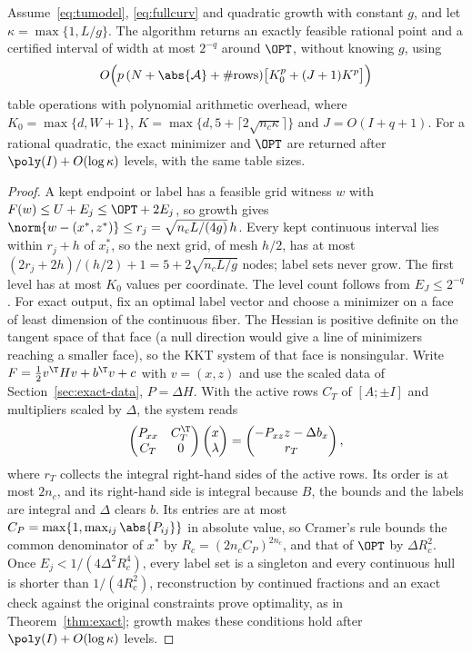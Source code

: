 \begin{theorem}[TU coupling]\label{thm:tu}
Assume~\eqref{eq:tumodel}, \eqref{eq:fullcurv} and quadratic growth with
constant $g$, and let $\kappa=\max\{1,L/g\}$. The algorithm returns an exactly
feasible rational point and a certified interval of width at most $2^{-q}$
around $\OPT$, without knowing $g$, using
\[
O\Bigl(p\,(N+\abs{\mathcal A}+\#\text{rows})\bigl[K_0^p+(J+1)K^p\bigr]\Bigr)
\]
table operations with polynomial arithmetic overhead, where
$K_0=\max\{d,W+1\}$, $K=\max\{d,5+\lceil2\sqrt{n_c\kappa}\rceil\}$ and
$J=O(I+q+1)$. For a rational quadratic, the exact minimizer and $\OPT$ are
returned after $\poly(I)+O(\log\kappa)$ levels, with the same table sizes.
\end{theorem}

\begin{proof}
A kept endpoint or label has a feasible grid witness $w$ with
$F(w)\le U+E_j\le\OPT+2E_j$, so growth gives
$\norm{w-(x^*,z^*)}\le r_j=\sqrt{n_cL/(4g)}\,h$. Every kept continuous interval
lies within $r_j+h$ of $x_i^*$, so the next grid, of mesh $h/2$, has at
most $(2r_j+2h)/(h/2)+1=5+2\sqrt{n_cL/g}$ nodes; label sets never grow. The
first level has at most $K_0$ values per coordinate. The level count follows
from $E_J\le2^{-q}$. For exact output, fix an optimal label vector and choose
a minimizer on a face of least dimension of the continuous fiber. The
Hessian is positive definite on the tangent space of that face (a null
direction would give a line of minimizers reaching a smaller face), so the
KKT system of that face is nonsingular. Write $F=\frac12v^\T Hv+b^\T v+c$
with $v=(x,z)$ and use the scaled data of Section~\ref{sec:exact-data},
$P=\Delta H$. With the active rows $C_T$ of $[A;\pm I]$ and multipliers
scaled by $\Delta$, the system reads
\[
\begin{pmatrix}P_{xx}&C_T^\T\\C_T&0\end{pmatrix}
\begin{pmatrix}x\\\lambda\end{pmatrix}=
\begin{pmatrix}-P_{xz}z-\Delta b_x\\ r_T\end{pmatrix},
\]
where $r_T$ collects the integral right-hand sides of the active rows. Its
order is at most $2n_c$, and its right-hand side is integral because $B$,
the bounds and the labels are integral and $\Delta$ clears $b$. Its entries are at most $C_P=\max\{1,\max_{ij}\abs{P_{ij}}\}$ in
absolute value, so Cramer's rule bounds the common denominator of $x^*$ by
$R_c=(2n_cC_P)^{2n_c}$, and that of $\OPT$ by $\Delta R_c^2$. Once
$E_j<1/(4\Delta^2R_c^4)$, every label set is a singleton and every continuous
hull is shorter than $1/(4R_c^2)$, reconstruction by continued fractions and
an exact check against the original constraints prove optimality, as in
Theorem~\ref{thm:exact}; growth makes these conditions hold after
$\poly(I)+O(\log\kappa)$ levels.
\end{proof}

